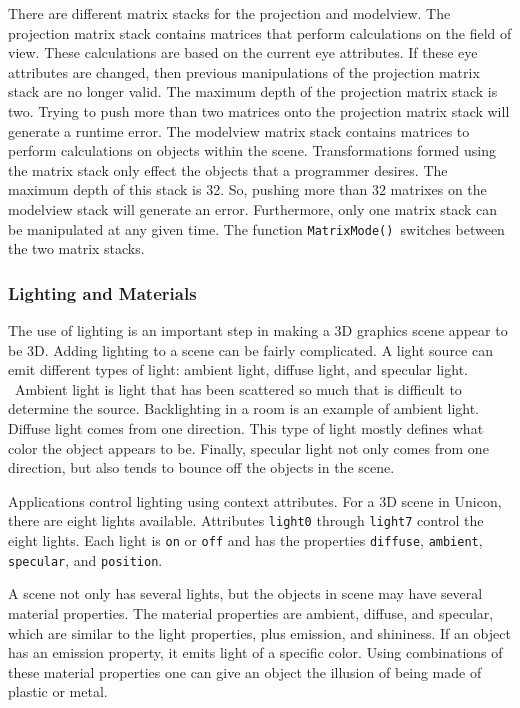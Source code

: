 There are different matrix stacks for the projection and modelview. The
projection matrix stack contains matrices that perform calculations on
the field of view. These calculations are based on the current eye
attributes. If these eye attributes are changed, then previous
manipulations of the projection matrix stack are no longer valid. The
maximum depth of the projection matrix stack is two. Trying to push
more than two matrices onto the projection matrix stack will generate a
runtime error. The modelview matrix stack contains matrices to perform
calculations on objects within the scene. Transformations formed using
the matrix stack only effect the objects that a programmer desires. The
maximum depth of this stack is 32. So, pushing more than 32 matrixes on
the modelview stack will generate an error. Furthermore, only one
matrix stack can be manipulated at any given time. The function
\texttt{MatrixMode()}\texttt{ }switches between the two matrix stacks. 

\subsubsection{Lighting and Materials}

The use of lighting is an important step in making a 3D graphics scene
appear to be 3D. Adding lighting to a scene can be fairly complicated.
A light source can emit different types of light: ambient light,
diffuse light, and specular light. \ Ambient light is light that has
been scattered so much that is difficult to determine the source.
Backlighting in a room is an example of ambient light. Diffuse light
comes from one direction. This type of light mostly defines what color
the object appears to be. Finally, specular light not only comes from
one direction, but also tends to bounce off the objects in the scene.

Applications control lighting using context attributes. For a 3D scene
in Unicon, there are eight lights available. Attributes \texttt{light0}
through \texttt{light7} control the eight lights. Each light is
\texttt{on} or \texttt{off} and has the properties \texttt{diffuse},
\texttt{ambient}, \texttt{specular}, and \texttt{position}. 

A scene not only has several lights, but the objects in scene may have
several material properties. The material properties are ambient,
diffuse, and specular, which are similar to the light properties, plus
emission, and shininess. If an object has an emission property, it
emits light of a specific color. Using combinations of these material
properties one can give an object the illusion of being made of plastic
or metal.

